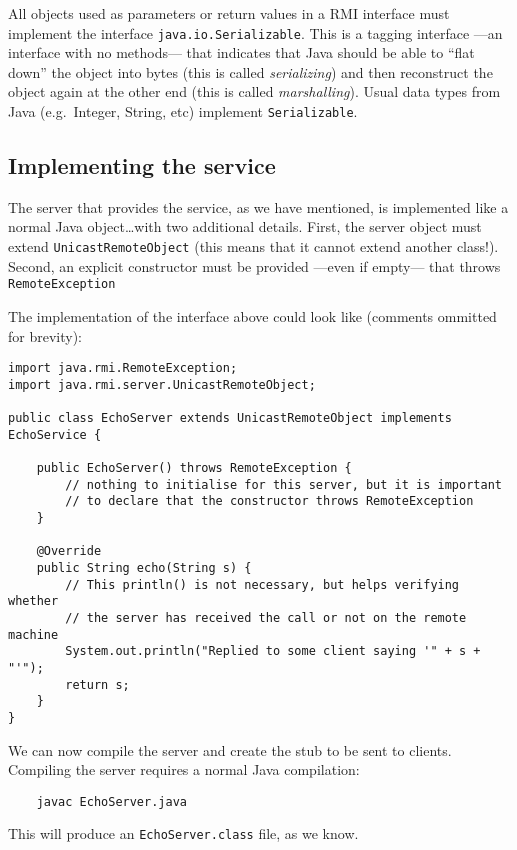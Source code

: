 All objects used as parameters or return values in a RMI interface
must implement the interface \verb+java.io.Serializable+. This is a
tagging interface ---an interface with no methods--- that indicates
that Java should be able to ``flat down'' the object into bytes
(this is called \emph{serializing}) 
and then reconstruct the object again at the other end
(this is called \emph{marshalling}).  
Usual data types from Java (e.g.~Integer, String, etc)
implement \verb+Serializable+.

\subsection{Implementing the service}
\label{sec:implementing-service}

The server that provides the service, 
as we have mentioned, is implemented like a normal Java
object\ldots with two additional details. First, the server object
must extend \verb+UnicastRemoteObject+ (this means that it cannot 
extend another class!). Second, an explicit constructor
must be provided ---even if empty--- that throws
\verb+RemoteException+

The implementation of the interface above could look like (comments
ommitted for brevity): 

\begin{verbatim}
import java.rmi.RemoteException;
import java.rmi.server.UnicastRemoteObject;

public class EchoServer extends UnicastRemoteObject implements EchoService {

    public EchoServer() throws RemoteException {
        // nothing to initialise for this server, but it is important 
        // to declare that the constructor throws RemoteException
    }

    @Override
    public String echo(String s) {
        // This println() is not necessary, but helps verifying whether 
        // the server has received the call or not on the remote machine 
        System.out.println("Replied to some client saying '" + s + "'");
        return s;
    }
}
\end{verbatim}

We can now compile the server and create the stub to be sent to
clients. Compiling the server requires a normal Java compilation: 

\begin{verbatim}
    javac EchoServer.java
\end{verbatim}

This will produce an \verb+EchoServer.class+ file, as we know. 

